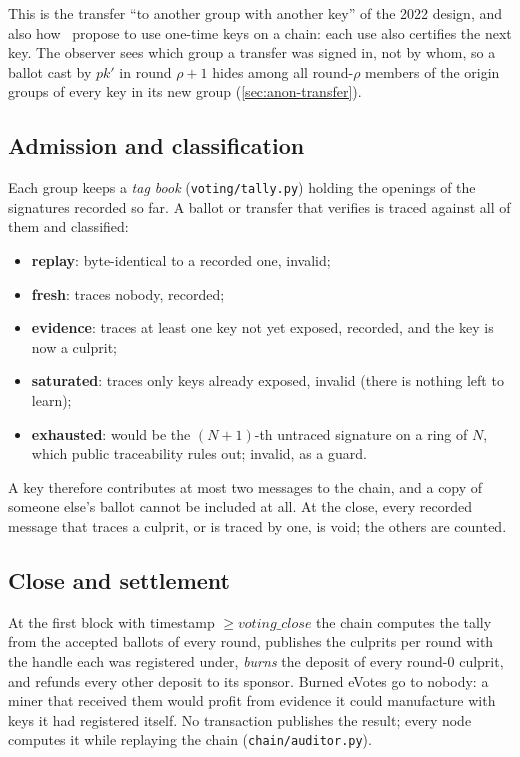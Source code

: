 \documentclass[11pt,a4paper]{article}
\newcommand{\pk}{\mathit{pk}}
\theoremstyle{definition}
\begin{document}
This is the transfer ``to another group with another key'' of the 2022
design, and also how~\cite[\S1.1]{SZ21} propose to use one-time keys on a
chain: each use also certifies the next key. The observer sees which
group a transfer was signed in, not by whom, so a ballot cast by $\pk'$ in
round $\rho + 1$ hides among all round-$\rho$ members of the origin groups
of every key in its new group (\cref{sec:anon-transfer}).

\subsection{Admission and classification}
\label{sec:admission}

Each group keeps a \emph{tag book} (\texttt{voting/tally.py}) holding the
openings of the signatures recorded so far. A ballot or transfer that
verifies is traced against all of them and classified:
\begin{itemize}[leftmargin=*]
\item \textbf{replay}: byte-identical to a recorded one, invalid;
\item \textbf{fresh}: traces nobody, recorded;
\item \textbf{evidence}: traces at least one key not yet exposed,
      recorded, and the key is now a culprit;
\item \textbf{saturated}: traces only keys already exposed, invalid
      (there is nothing left to learn);
\item \textbf{exhausted}: would be the $(N+1)$-th untraced signature on a
      ring of $N$, which public traceability rules out; invalid, as a
      guard.
\end{itemize}
A key therefore contributes at most two messages to the chain, and a copy
of someone else's ballot cannot be included at all. At the close, every
recorded message that traces a culprit, or is traced by one, is void; the
others are counted.

\subsection{Close and settlement}

At the first block with timestamp $\ge \mathit{voting\_close}$ the chain
computes the tally from the accepted ballots of every round, publishes
the culprits per round with the handle each was registered under,
\emph{burns} the deposit of every round-0 culprit, and refunds every other
deposit to its sponsor. Burned eVotes go to nobody: a miner that received
them would profit from evidence it could manufacture with keys it had
registered itself. No transaction publishes the result; every node
computes it while replaying the chain (\texttt{chain/auditor.py}).
\end{document}

